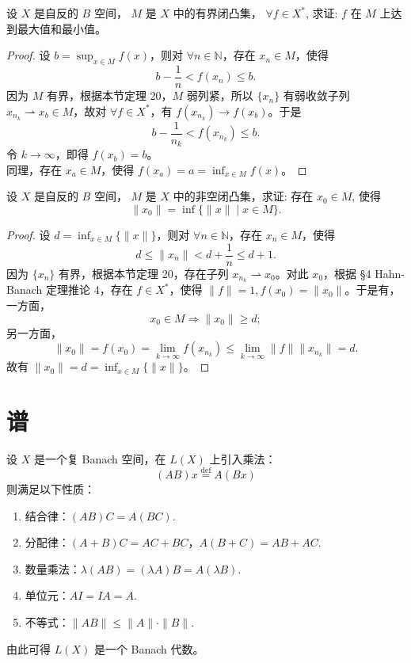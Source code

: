 \documentclass[lang=cn,newtx,10pt,scheme=chinese,thmcnt=chapter]{elegantbook}
\begin{document}
\begin{problem}
  设 ${X}$ 是自反的 ${B}$ 空间， ${M}$ 是 ${X}$ 中的有界闭凸集， $\forall f \in {X}^*$, 求证: $f$ 在 ${M}$ 上达到最大值和最小值。
\end{problem}
\begin{proof}
    设 \(b = \sup_{x \in M} f(x)\)，则对 \(\forall n \in \mathbb{N}\)，存在 \(x_n \in M\)，使得
\[
b - \frac{1}{n} < f(x_n) \leqslant b.
\]
因为 \(M\) 有界，根据本节定理 20，\(M\) 弱列紧，所以 \(\{x_n\}\) 有弱收敛子列 \(x_{n_k} \rightharpoonup x_b \in M\)，故对 \(\forall f \in X^*\)，有 \(f(x_{n_k}) \rightarrow f(x_b)\)。于是
\[
b - \frac{1}{n_k} < f(x_{n_k}) \leqslant b.
\]
令 \(k \to \infty\)，即得 \(f(x_b) = b\)。\\
同理，存在 \(x_a \in M\)，使得 \(f(x_a) = a = \inf_{x \in M} f(x)\)。
\end{proof}
\begin{problem}
  设 ${X}$ 是自反的 ${B}$ 空间， ${M}$ 是 ${X}$ 中的非空闭凸集，求证: 存在 $x_0 \in {M}$, 使得
  \[
  \|x_0\| = \inf \{\|x\| \mid x \in {M}\}.
  \]
\end{problem}
\begin{proof}
    设 \(d = \inf_{x \in M} \{\|x\|\}\)，则对 \(\forall n \in \mathbb{N}\)，存在 \(x_n \in M\)，使得
\[
d \leqslant \|x_n\| < d + \frac{1}{n} \leqslant d + 1.
\]
因为 \(\{x_n\}\) 有界，根据本节定理 20，存在子列 \(x_{n_k} \rightharpoonup x_0\)。对此 \(x_0\)，根据 §4 Hahn-Banach 定理推论 4，存在 \(f \in X^*\)，使得 \(\|f\| = 1, f(x_0) = \|x_0\|\)。于是有，一方面，
\[
x_0 \in M \Rightarrow \|x_0\| \geqslant d;
\]
另一方面，
\[
\|x_0\| = f(x_0) = \lim_{k \to \infty} f(x_{n_k}) \leqslant \lim_{k \to \infty} \|f\| \|x_{n_k}\| = d.
\]
故有 \(\|x_0\| = d = \inf_{x \in M} \{\|x\|\}\)。
\end{proof}
\section{谱}
\begin{definition}
设 $X$ 是一个复 Banach 空间，在 $L(X)$ 上引入乘法：
\begin{equation*}
(A B) x \stackrel{\text{def}}{=} A(B x)
\end{equation*}
则满足以下性质：
\begin{enumerate}
    \item 结合律：$(A B) C = A(B C)$.
    \item 分配律：$(A + B) C = A C + B C$，$A(B + C) = A B + A C$.
    \item 数量乘法：$\lambda(A B) = (\lambda A) B = A(\lambda B)$.
    \item 单位元：$A I = I A = A$.
    \item 不等式：$\|A B\| \leqslant \|A\| \cdot \|B\|$.
\end{enumerate}
由此可得 $L(X)$ 是一个 Banach 代数。
\end{definition}
\end{document}

